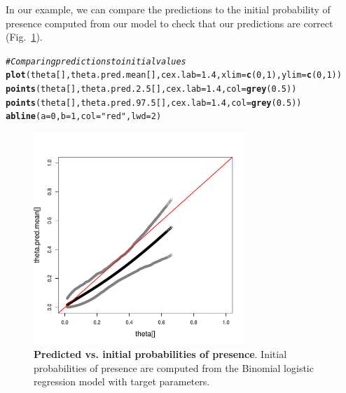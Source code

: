 \documentclass[a4paper, 12pt, leqno]{article}\usepackage[]{graphicx}\usepackage[]{color}
\makeatletter
\newcommand{\hlnum}[1]{\textcolor[rgb]{0.686,0.059,0.569}{#1}}%
\newcommand{\hlstr}[1]{\textcolor[rgb]{0.192,0.494,0.8}{#1}}%
\newcommand{\hlcom}[1]{\textcolor[rgb]{0.678,0.584,0.686}{\textit{#1}}}%
\newcommand{\hlstd}[1]{\textcolor[rgb]{0.345,0.345,0.345}{#1}}%
\newcommand{\hlkwc}[1]{\textcolor[rgb]{0.333,0.667,0.333}{#1}}%
\newcommand{\hlkwd}[1]{\textcolor[rgb]{0.737,0.353,0.396}{\textbf{#1}}}%
\newenvironment{kframe}{%
 \def\at@end@of@kframe{}%
 \ifinner\ifhmode%
  \def\at@end@of@kframe{\end{minipage}}%
  \begin{minipage}{\columnwidth}%
 \fi\fi%
 \def\FrameCommand##1{\hskip\@totalleftmargin \hskip-\fboxsep
 \colorbox{shadecolor}{##1}\hskip-\fboxsep
     \hskip-\linewidth \hskip-\@totalleftmargin \hskip\columnwidth}%
 \MakeFramed {\advance\hsize-\width
   \@totalleftmargin\z@ \linewidth\hsize
   \@setminipage}}%
 {\par\unskip\endMakeFramed%
 \at@end@of@kframe}
\newenvironment{knitrout}{}{} %
\makeatother
\begin{document}
In our example, we can compare the predictions to the initial probability of presence
computed from our model to check that our predictions are correct
(Fig.~\ref{fig:pred-obs-binomial}).

\begin{knitrout}\small
{}\color{fgcolor}\begin{kframe}
\begin{alltt}
\hlcom{# Comparing predictions to initial values}
\hlkwd{plot}\hlstd{(theta[],theta.pred.mean[],}\hlkwc{cex.lab}\hlstd{=}\hlnum{1.4}\hlstd{,}\hlkwc{xlim}\hlstd{=}\hlkwd{c}\hlstd{(}\hlnum{0}\hlstd{,}\hlnum{1}\hlstd{),}\hlkwc{ylim}\hlstd{=}\hlkwd{c}\hlstd{(}\hlnum{0}\hlstd{,}\hlnum{1}\hlstd{))}
\hlkwd{points}\hlstd{(theta[],theta.pred.2.5[],}\hlkwc{cex.lab}\hlstd{=}\hlnum{1.4}\hlstd{,}\hlkwc{col}\hlstd{=}\hlkwd{grey}\hlstd{(}\hlnum{0.5}\hlstd{))}
\hlkwd{points}\hlstd{(theta[],theta.pred.97.5[],}\hlkwc{cex.lab}\hlstd{=}\hlnum{1.4}\hlstd{,}\hlkwc{col}\hlstd{=}\hlkwd{grey}\hlstd{(}\hlnum{0.5}\hlstd{))}
\hlkwd{abline}\hlstd{(}\hlkwc{a}\hlstd{=}\hlnum{0}\hlstd{,}\hlkwc{b}\hlstd{=}\hlnum{1}\hlstd{,}\hlkwc{col}\hlstd{=}\hlstr{"red"}\hlstd{,}\hlkwc{lwd}\hlstd{=}\hlnum{2}\hlstd{)}
\end{alltt}
\end{kframe}
\end{knitrout}


\begin{figure} 
  \centering \includegraphics[width=8cm]{figures/pred-obs-binomial.pdf}
  
  \caption{\textbf{Predicted vs. initial probabilities of presence}. Initial probabilities
    of presence are computed from the Binomial logistic regression model with target
    parameters.}
  
  \label{fig:pred-obs-binomial}
  
\end{figure}
\end{document}
